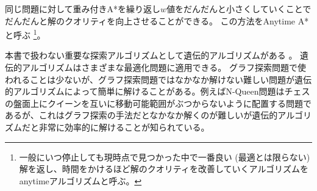 同じ問題に対して重み付きA*を繰り返し$w$値をだんだんと小さくしていくことでだんだんと解のクオリティを向上させることができる。
この方法をAnytime A*と呼ぶ \cite{likhachev2004ara} \footnote{一般にいつ停止しても現時点で見つかった中で一番良い (最適とは限らない)解を返し、時間をかけるほど解のクオリティを改善していくアルゴリズムをanytimeアルゴリズムと呼ぶ。}。

本書で扱わない重要な探索アルゴリズムとして遺伝的アルゴリズムがある \cite{goldberg1989}。
遺伝的アルゴリズムはさまざまな最適化問題に適用できる。
グラフ探索問題で使われることは少ないが、グラフ探索問題ではなかなか解けない難しい問題が遺伝的アルゴリズムによって簡単に解けることがある。例えばN-Queen問題はチェスの盤面上にクイーンを互いに移動可能範囲がぶつからないように配置する問題であるが、これはグラフ探索の手法だとなかなか解くのが難しいが遺伝的アルゴリズムだと非常に効率的に解けることが知られている。
